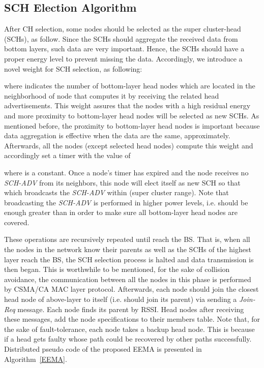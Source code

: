 \documentclass[journal]{IEEEtran}
\begin{document}
 \subsection{SCH Election Algorithm}
\label{subsec:SCH-el}

After CH selection, some nodes should be selected as the super cluster-head (SCHs), as follow. Since the SCHs should aggregate the received data from bottom layers, such data are very important. Hence, the SCHs should have a proper energy level to prevent missing the data. Accordingly, we introduce a novel weight for SCH selection, as following:   


where  indicates the number of bottom-layer head nodes which are located in the neighborhood of node  that computes it by receiving the related head advertisements.  This weight assures that the nodes with a high residual energy and more proximity to bottom-layer head nodes will be selected as new SCHs. As mentioned before, the proximity to bottom-layer head nodes is important because data aggregation is effective when the data are the same, approximately. 
 Afterwards, all the nodes (except selected head nodes) compute this weight and accordingly set a timer with the value of

where  is a constant. Once a node's timer has expired and the node receives no {\it SCH-ADV} from its neighbors,  this node will elect itself as new SCH so that which broadcasts the {\it SCH-ADV} within  (super cluster range). Note that broadcasting the {\it SCH-ADV} is performed in higher power levels, i.e.  should be enough greater than  in order to make sure all bottom-layer head nodes are covered.

These operations are recursively repeated until reach the BS. That is, when all the nodes in the network know their parents as well as the SCHs of the highest layer reach the BS, the SCH selection process is halted and data transmission is then began.  This is worthwhile to be mentioned, for the sake of collision avoidance, the communication between all the nodes in this phase is performed by CSMA/CA MAC layer protocol.  Afterwards, each node should join the closest head node of above-layer to itself (i.e. should join its parent) via sending a {\it Join-Req} message.  Each node finds its parent by RSSI. Head nodes after receiving these messages, add the node specifications to their members table. Note that, for the sake of fault-tolerance, each node takes a backup head node. This is because if a head gets faulty whose path could be recovered by other paths successfully. Distributed pseudo code of the proposed EEMA is presented in Algorithm~\ref{EEMA}.
\end{document}
